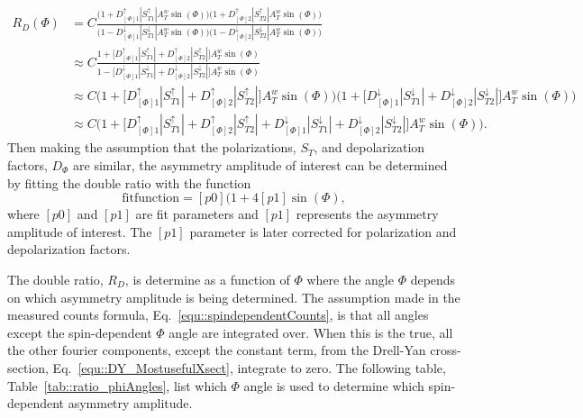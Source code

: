 \begin{align}
  R_D(\Phi) &=
  C\frac{\Big(1+D_{[\Phi]1}^{\uparrow}|S_{T1}^{\uparrow}|A^w_T\sin(\Phi)\Big)
    \Big(1+D_{[\Phi]2}^{\uparrow}|S_{T2}^{\uparrow}|A^w_T\sin(\Phi)\Big)}
  {\Big(1-D_{[\Phi]1}^{\downarrow}|S_{T1}^{\downarrow}|A^w_T\sin(\Phi)\Big)
    \Big(1-D_{[\Phi]2}^{\downarrow}|S_{T2}^{\downarrow}|A^w_T\sin(\Phi)\Big)}
  \\ \nonumber &\approx
  C\frac{1+\Big[D_{[\Phi]1}^{\uparrow}|S_{T1}^{\uparrow}|+D_{[\Phi]2}^{\uparrow}|S_{T2}^{\uparrow}|\Big]
    A^w_T\sin(\Phi)}
  {1-\Big[D_{[\Phi]1}^{\downarrow}|S_{T1}^{\downarrow}|+D_{[\Phi]2}^{\downarrow}|S_{T2}^{\downarrow}|\Big]
    A^w_T\sin(\Phi)} \\ \nonumber &\approx
  C\Big(1+\Big[D_{[\Phi]1}^{\uparrow}|S_{T1}^{\uparrow}|+D_{[\Phi]2}^{\uparrow}|S_{T2}^{\uparrow}|\Big]
  A^w_T\sin(\Phi)\Big)\Big(1+\Big[D_{[\Phi]1}^{\downarrow}|S_{T1}^{\downarrow}|+D_{[\Phi]2}^{\downarrow}|S_{T2}^{\downarrow}|\Big]
  A^w_T\sin(\Phi)\Big) \\ \nonumber &\approx C\Big(1 +
  \Big[D_{[\Phi]1}^{\uparrow}|S_{T1}^{\uparrow}|+D_{[\Phi]2}^{\uparrow}|S_{T2}^{\uparrow}|+D_{[\Phi]1}^{\downarrow}|S_{T1}^{\downarrow}|+D_{[\Phi]2}^{\downarrow}|S_{T2}^{\downarrow}|\Big]A^w_T\sin(\Phi)\Big).
\end{align}
\noindent
Then making the assumption that the polarizations, $S_T$, and depolarization
factors, $D_{\Phi}$ are similar, the asymmetry amplitude of interest can be
determined by fitting the double ratio with the function
\begin{equation}
  \label{equ::dr_fit_formula}
  \mathrm{fit function} = [p0](1+4[p1]\sin(\Phi),
\end{equation}
\noindent
where $[p0]$ and $[p1]$ are fit parameters and $[p1]$ represents the asymmetry
amplitude of interest.  The $[p1]$ parameter is later corrected for polarization
and depolarization factors.

The double ratio, $R_D$, is determine as a function of $\Phi$ where the angle
$\Phi$ depends on which asymmetry amplitude is being determined.  The assumption
made in the measured counts formula, Eq.~\ref{equ::spindependentCounts}, is that
all angles except the spin-dependent $\Phi$ angle are integrated over.  When
this is the true, all the other fourier components, except the constant term,
from the Drell-Yan cross-section, Eq.~\ref{equ::DY_MostusefulXsect}, integrate
to zero.  The following table, Table~\ref{tab::ratio_phiAngles}, list which
$\Phi$ angle is used to determine which spin-dependent asymmetry amplitude.

